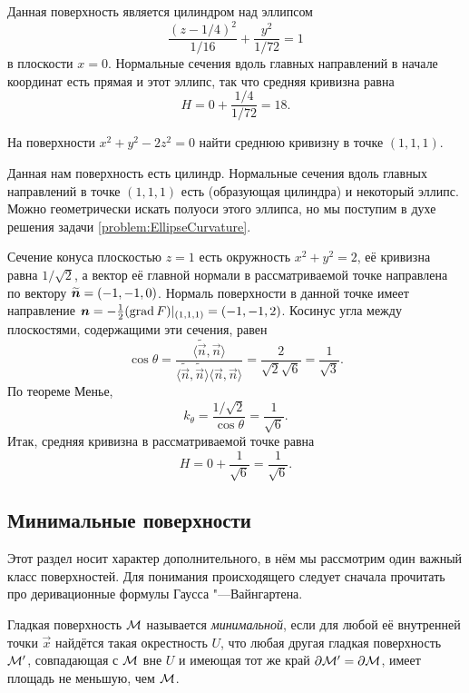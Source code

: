 \begin{solution}
	Данная поверхность является цилиндром над эллипсом
	\[
		\frac{(z - 1 / 4)^2}{1 / 16} + \frac{y^2}{1 / 72} = 1
	\]
	в плоскости $x = 0$. Нормальные сечения вдоль главных направлений в начале координат есть прямая и этот эллипс, так что средняя кривизна равна
	\[
		H = 0 + \frac{1 / 4}{1 / 72} = 18.
	\]
\end{solution}

\begin{problem}
	На поверхности $x^2 + y^2 - 2z^2 = 0$ найти среднюю кривизну в точке $(1, 1, 1)$.
\end{problem}

\begin{solution}
	Данная нам поверхность есть цилиндр. Нормальные сечения вдоль главных направлений в точке $(1, 1, 1)$ есть (образующая цилиндра) и некоторый эллипс. Можно геометрически искать полуоси этого эллипса, но мы поступим в духе решения задачи \ref{problem:EllipseCurvature}.

	Сечение конуса плоскостью $z = 1$ есть окружность $x^2 + y^2 = 2$, её кривизна равна $1 / \sqrt{2}$, а вектор её главной нормали в рассматриваемой точке направлена по вектору $\widetilde{\boldsymbol{n}} = \left(-1, -1, 0\right)$. Нормаль поверхности в данной точке имеет направление $\boldsymbol{n} = -\frac{1}{2}(\operatorname{grad} F)|_{(1, 1, 1)} = (-1, -1, 2)$. Косинус угла между плоскостями, содержащими эти сечения, равен
	\[
		\cos\theta = \frac{\langle\widetilde{\vec{n}}, \vec{n}\rangle}{\langle\widetilde{\vec{n}}, \widetilde{\vec{n}}\rangle\langle\vec{n}, \vec{n}\rangle} = \frac{2}{\sqrt{2} \sqrt{6}} = \frac{1}{\sqrt{3}}.
	\]
	По теореме Менье,
	\[
		k_{\theta} = \frac{1 / \sqrt{2}}{\cos\theta} = \frac{1}{\sqrt{6}}.
	\]
	Итак, средняя кривизна в рассматриваемой точке равна
	\[
		H = 0 + \frac{1}{\sqrt{6}} = \frac{1}{\sqrt{6}}.
	\]
\end{solution}

\subsection{Минимальные поверхности}

Этот раздел носит характер дополнительного, в нём мы рассмотрим один важный класс поверхностей. Для понимания происходящего следует сначала прочитать про деривационные формулы Гаусса "---Вайнгартена.

\begin{definition}
	Гладкая поверхность $\mathcal{M}$ называется \textit{минимальной}, если для любой её внутренней точки $\vec{x}$ найдётся такая окрестность $U$, что любая другая гладкая поверхность $\mathcal{M}^\prime$, совпадающая с $\mathcal{M}$ вне $U$ и имеющая тот же край $\partial\mathcal{M}^\prime = \partial\mathcal{M}$, имеет площадь не меньшую, чем $\mathcal{M}$.
\end{definition}

